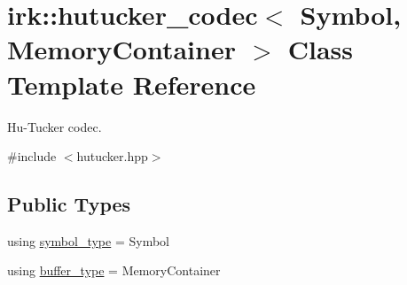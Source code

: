 \hypertarget{classirk_1_1hutucker__codec}{}\section{irk\+:\+:hutucker\+\_\+codec$<$ Symbol, Memory\+Container $>$ Class Template Reference}
\label{classirk_1_1hutucker__codec}


Hu-\/\+Tucker codec.  




{\ttfamily \#include $<$hutucker.\+hpp$>$}

\subsection*{Public Types}
\begin{DoxyCompactItemize}
\item 
using \mbox{\hyperlink{classirk_1_1hutucker__codec_af23dee5959ae2a69eea0ab324cf6ecb6}{symbol\+\_\+type}} = Symbol
\item 
using \mbox{\hyperlink{classirk_1_1hutucker__codec_a995378c8c253dae9867a4b1762eeaf95}{buffer\+\_\+type}} = Memory\+Container
\end{DoxyCompactItemize}
